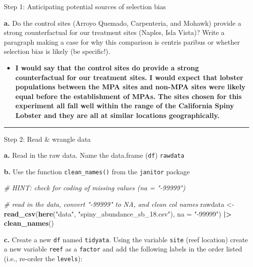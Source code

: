 \documentclass[
]{article}
\newenvironment{Shaded}{\begin{snugshade}}{\end{snugshade}}
\newcommand{\AttributeTok}[1]{\textcolor[rgb]{0.13,0.29,0.53}{#1}}
\newcommand{\CommentTok}[1]{\textcolor[rgb]{0.56,0.35,0.01}{\textit{#1}}}
\newcommand{\FunctionTok}[1]{\textcolor[rgb]{0.13,0.29,0.53}{\textbf{#1}}}
\newcommand{\NormalTok}[1]{#1}
\newcommand{\OtherTok}[1]{\textcolor[rgb]{0.56,0.35,0.01}{#1}}
\newcommand{\SpecialCharTok}[1]{\textcolor[rgb]{0.81,0.36,0.00}{\textbf{#1}}}
\newcommand{\StringTok}[1]{\textcolor[rgb]{0.31,0.60,0.02}{#1}}
\providecommand{\tightlist}{%
  \setlength{\itemsep}{0pt}\setlength{\parskip}{0pt}}
\begin{document}
Step 1: Anticipating potential sources of selection bias

\textbf{a.} Do the control sites (Arroyo Quemado, Carpenteria, and
Mohawk) provide a strong counterfactual for our treatment sites (Naples,
Isla Vista)? Write a paragraph making a case for why this comparison is
centris paribus or whether selection bias is likely (be specific!).

\begin{itemize}
\tightlist
\item
  \textbf{I would say that the control sites do provide a strong
  counterfactual for our treatment sites. I would expect that lobster
  populations between the MPA sites and non-MPA sites were likely equal
  before the establishment of MPAs. The sites chosen for this experiment
  all fall well within the range of the California Spiny Lobster and
  they are all at similar locations geographically.}
\end{itemize}

\begin{center}\rule{0.5\linewidth}{0.5pt}\end{center}

Step 2: Read \& wrangle data

\textbf{a.} Read in the raw data. Name the data.frame (\texttt{df})
\texttt{rawdata}

\textbf{b.} Use the function \texttt{clean\_names()} from the
\texttt{janitor} package

\begin{Shaded}
\begin{Highlighting}[]
\CommentTok{\# HINT: check for coding of missing values (\textasciigrave{}na = "{-}99999"\textasciigrave{})}

\CommentTok{\# read in the data, convert "{-}99999" to NA, and clean col names}
\NormalTok{rawdata }\OtherTok{\textless{}{-}} \FunctionTok{read\_csv}\NormalTok{(}\FunctionTok{here}\NormalTok{(}\StringTok{"data"}\NormalTok{, }\StringTok{"spiny\_abundance\_sb\_18.csv"}\NormalTok{), }\AttributeTok{na =} \StringTok{"{-}99999"}\NormalTok{) }\SpecialCharTok{|\textgreater{}}
    \FunctionTok{clean\_names}\NormalTok{()}
\end{Highlighting}
\end{Shaded}

\textbf{c.} Create a new \texttt{df} named \texttt{tidyata}. Using the
variable \texttt{site} (reef location) create a new variable
\texttt{reef} as a \texttt{factor} and add the following labels in the
order listed (i.e., re-order the \texttt{levels}):
\end{document}
